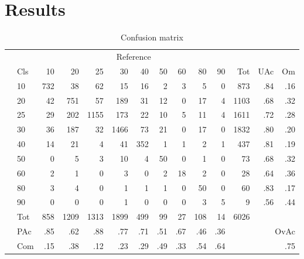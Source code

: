 \section{Results}
\label{sec:result}

\begin{table}
	\centering
	\caption[Accuracy assessment]{Confusion matrix}
	\label{tab:accuracy_tab}
	\begin{tabular}{ll|rrrrrrrrr|rrr}
		& & \multicolumn{9}{c|}{Reference} & & & \\
		& Cls & 10 & 20 & 25 & 30 & 40 & 50 & 60 & 80 & 90 & Tot & UAc & Om \\\hline
		\multirow{9}{*}{\STAB{\rotatebox[origin=c]{90}{Prediction}}}
		& 10 & 732 & 38 & 62 & 15 & 16 & 2 & 3 & 5 & 0 & 873 & .84 & .16 \\ 
		& 20 & 42 & 751 & 57 & 189 & 31 & 12 & 0 & 17 & 4 & 1103 & .68 & .32 \\ 
		& 25 & 29 & 202 & 1155 & 173 & 22 & 10 & 5 & 11 & 4 & 1611 & .72 & .28 \\ 
		& 30 & 36 & 187 & 32 & 1466 & 73 & 21 & 0 & 17 & 0 & 1832 & .80 & .20 \\ 
		& 40 & 14 & 21 & 4 & 41 & 352 & 1 & 1 & 2 & 1 & 437 & .81 & .19 \\ 
		& 50 & 0 & 5 & 3 & 10 & 4 & 50 & 0 & 1 & 0 & 73 & .68 & .32 \\ 
		& 60 & 2 & 1 & 0 & 3 & 0 & 2 & 18 & 2 & 0 & 28 & .64 & .36 \\ 
		& 80 & 3 & 4 & 0 & 1 & 1 & 1 & 0 & 50 & 0 & 60 & .83 & .17 \\ 
		& 90 & 0 & 0 & 0 & 1 & 0 & 0 & 0 & 3 & 5 & 9 & .56 & .44 \\\hline 
		& Tot & 858 & 1209 & 1313 & 1899 & 499 & 99 & 27 & 108 & 14 & 6026 & & \\
		& PAc & .85 & .62 & .88 & .77 & .71 & .51 & .67 & .46 & .36 & & \multicolumn{2}{r}{OvAc} \\
		& Com & .15 & .38 & .12 & .23 & .29 & .49 & .33 & .54 & .64 & &
		\multicolumn{2}{r}{.75} \\ 
	\end{tabular}
\end{table}


